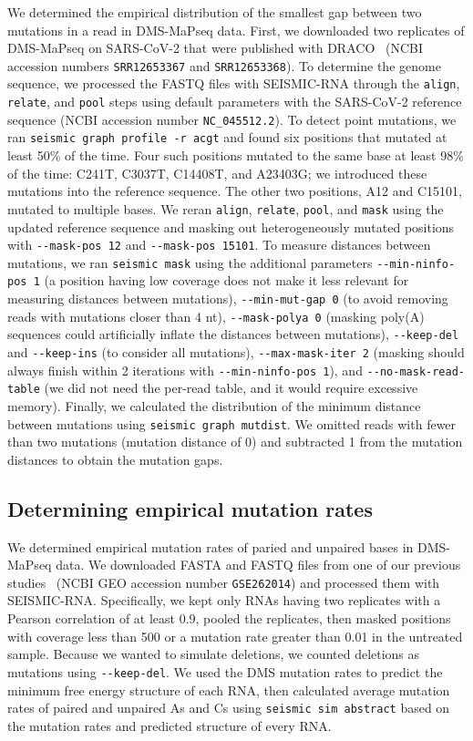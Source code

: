 \documentclass[11pt]{article}
\begin{document}
We determined the empirical distribution of the smallest gap between two mutations in a read in DMS-MaPseq data.
First, we downloaded two replicates of DMS-MaPseq on SARS-CoV-2 that were published with DRACO~\cite{Morandi2021} (NCBI accession numbers \verb|SRR12653367| and \verb|SRR12653368|).
To determine the genome sequence, we processed the FASTQ files with SEISMIC-RNA through the \verb|align|, \verb|relate|, and \verb|pool| steps using default parameters with the SARS-CoV-2 reference sequence (NCBI accession number \verb|NC_045512.2|).
To detect point mutations, we ran \verb|seismic graph profile -r acgt| and found six positions that mutated at least 50\% of the time.
Four such positions mutated to the same base at least 98\% of the time: C241T, C3037T, C14408T, and A23403G; we introduced these mutations into the reference sequence.
The other two positions, A12 and C15101, mutated to multiple bases.
We reran \verb|align|, \verb|relate|, \verb|pool|, and \verb|mask| using the updated reference sequence and masking out heterogeneously mutated positions with \verb|--mask-pos 12| and \verb|--mask-pos 15101|.
To measure distances between mutations, we ran \verb|seismic mask| using the additional parameters \verb|--min-ninfo-pos 1| (a position having low coverage does not make it less relevant for measuring distances between mutations), \verb|--min-mut-gap 0| (to avoid removing reads with mutations closer than 4 nt), \verb|--mask-polya 0| (masking poly(A) sequences could artificially inflate the distances between mutations), \verb|--keep-del| and \verb|--keep-ins| (to consider all mutations), \verb|--max-mask-iter 2| (masking should always finish within 2 iterations with \verb|--min-ninfo-pos 1|), and \verb|--no-mask-read-table| (we did not need the per-read table, and it would require excessive memory).
Finally, we calculated the distribution of the minimum distance between mutations using \verb|seismic graph mutdist|.
We omitted reads with fewer than two mutations (mutation distance of 0) and subtracted 1 from the mutation distances to obtain the mutation gaps.


\subsection{Determining empirical mutation rates}
\label{empirical-mutation-rates}

We determined empirical mutation rates of paried and unpaired bases in DMS-MaPseq data.
We downloaded FASTA and FASTQ files from one of our previous studies~\cite{deLajarte2024} (NCBI GEO accession number \verb|GSE262014|) and processed them with SEISMIC-RNA.
Specifically, we kept only RNAs having two replicates with a Pearson correlation of at least 0.9, pooled the replicates, then masked positions with coverage less than 500 or a mutation rate greater than 0.01 in the untreated sample.
Because we wanted to simulate deletions, we counted deletions as mutations using \verb|--keep-del|.
We used the DMS mutation rates to predict the minimum free energy structure of each RNA, then calculated average mutation rates of paired and unpaired As and Cs using \verb|seismic sim abstract| based on the mutation rates and predicted structure of every RNA.
\end{document}
